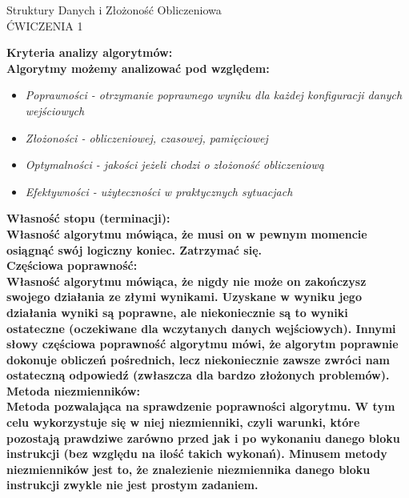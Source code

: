 \documentclass[a4paper,12pt]{article}
\newcommand{\h}[1]{\noindent \bf #1 \rm \\ \noindent}
\newcommand{\italic}[1]{\it #1 \rm}
\begin{document}
\begin{center}
	\LARGE
	Struktury Danych i Złożoność Obliczeniowa \\
	\large
	ĆWICZENIA 1 
\end{center}
\vspace{1cm}

\h{Kryteria analizy algorytmów:}
Algorytmy możemy analizować pod względem:
\begin{itemize}
	\item \italic{Poprawności} - otrzymanie poprawnego wyniku dla każdej konfiguracji danych wejściowych
	\item \italic{Złożoności} - obliczeniowej, czasowej, pamięciowej
	\item \italic{Optymalności} - jakości jeżeli chodzi o złożoność obliczeniową
	\item \italic{Efektywności} - użyteczności w praktycznych sytuacjach
\end{itemize}

\h{Własność stopu (terminacji):}
Własność algorytmu mówiąca, że musi on w pewnym momencie osiągnąć swój logiczny koniec. Zatrzymać się.\\

\h{Częściowa poprawność:}
Własność algorytmu mówiąca, że nigdy nie może on zakończysz swojego działania ze złymi wynikami. Uzyskane w wyniku jego działania wyniki są poprawne, ale niekoniecznie są to wyniki ostateczne (oczekiwane dla wczytanych danych wejściowych). Innymi słowy częściowa poprawność algorytmu mówi, że algorytm poprawnie dokonuje obliczeń pośrednich, lecz niekoniecznie zawsze zwróci nam ostateczną odpowiedź (zwłaszcza dla bardzo złożonych problemów).\\

\h{Metoda niezmienników:}
Metoda pozwalająca na sprawdzenie poprawności algorytmu. W tym celu wykorzystuje się w niej niezmienniki, czyli warunki, które pozostają prawdziwe zarówno przed jak i po wykonaniu danego bloku instrukcji (bez względu na ilość takich wykonań). Minusem metody niezmienników jest to, że znalezienie niezmiennika danego bloku instrukcji zwykle nie jest prostym zadaniem.
\end{document}
